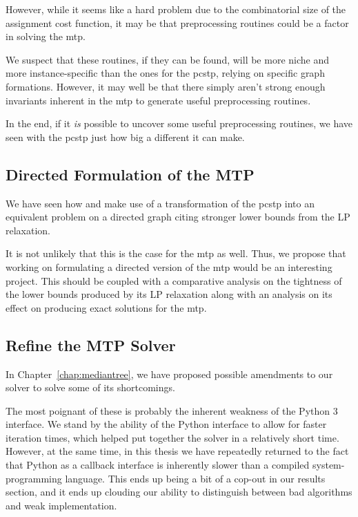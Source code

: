 However, while it seems like a hard problem due to the combinatorial size of the assignment
cost function, it may be that preprocessing routines could be a factor in solving the
\gls{mtp}.

We suspect that these routines, if they can be found,
will be more niche and more instance-specific
than the ones for the \gls{pcstp}, relying
on specific graph formations. However, it may well be that there simply aren't strong enough
invariants inherent in the \gls{mtp} to generate useful preprocessing routines.

In the end, if it \textit{is} possible to uncover some useful preprocessing routines,
we have seen with the \gls{pcstp}
just how big a different it can make.

\subsection{Directed Formulation of the MTP}

We have seen how \citet{ljubic2005solving} and \citet{gamrath2017scip}
make use of a transformation of
the \gls{pcstp} into an equivalent problem on a directed graph citing stronger
lower bounds from the LP relaxation.
  
It is not unlikely that this is the case for the \gls{mtp} as well. Thus, we propose
that working on formulating a directed version of the \gls{mtp} would be an
interesting project.
This should be coupled with a comparative analysis
on the tightness of the lower bounds produced by its LP relaxation along with an
analysis on its effect on producing exact solutions for the \gls{mtp}.

\subsection{Refine the MTP Solver}

In Chapter~\ref{chap:mediantree}, we have proposed possible amendments to our solver to
solve some of its shortcomings.

The most poignant of these is probably the inherent weakness
of the Python 3 interface.
We stand by the ability of the Python interface to allow for faster iteration times,
which helped put together the solver in a relatively short time.
However, at the same time, in this thesis we have repeatedly
returned to the fact that Python as a callback interface is
inherently slower than a compiled system-programming language.
This ends up being a bit of a cop-out in our results section,
and it ends up clouding our ability
to distinguish between bad algorithms
and weak implementation.

